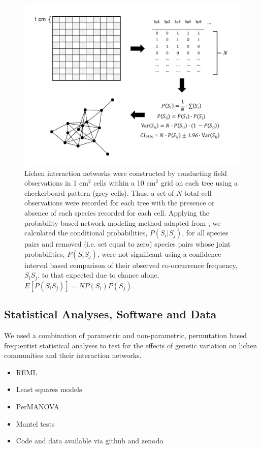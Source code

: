 \documentclass[9pt,twocolumn,twoside,lineno]{pnas-new}
\begin{document}
{\begin{figure}[ht]
\centering
\includegraphics[width=\linewidth]{lcn_araujo_method.pdf}
\caption{Lichen interaction networks were constructed by conducting
  field observations in 1 cm$^2$ cells within a 10 cm$^2$ grid on each
  tree using a checkerboard pattern (grey cells). Thus, a set of $N$
  total cell observations were recorded for each tree with the
  presence or absence of each species recorded for each cell. Applying
  the probability-based network modeling method adapted from
  \cite{Araujo2011}, we calculated the conditional probabilities,
  $P(S_i|S_j)$, for all species pairs and removed (i.e. set equal to
  zero) species pairs whose joint probabilities, $P(S_i S_j)$, were
  not significant using a confidence interval based comparison of
  their observed co-occurrence frequency, $S_iS_j$, to that expected
  due to chance alone, $E[P(S_iS_j)] = N P(S_i) P(S_j)$.}
\label{fig:conet_method}
\end{figure}


\subsection*{Statistical Analyses, Software and Data}

We used a combination of parametric and non-parametric, permutation
based frequentist statistical analyses to test for the effects of
genetic variation on lichen communities and their interaction
networks. 

\begin{itemize}
  \item REML
  \item Least squares models
  \item PerMANOVA
  \item Mantel tests
  \item Code and data available via github and zenodo
\end{itemize}

}
\end{document}
